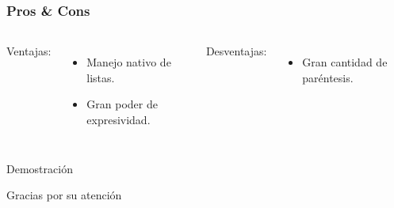 \documentclass{beamer}
\begin{document}

\begin{frame}
\frametitle{Pros \& Cons}
\begin{columns}[c] %

Ventajas:
\begin{itemize}
  \item Manejo nativo de listas.
  \item Gran poder de expresividad.
\end{itemize}

Desventajas:
\begin{itemize}
  \item Gran cantidad de par\'entesis.
\end{itemize}
\end{columns}
\end{frame}

\begin{frame}
\Huge{\centerline{Demostraci\'on}}
\end{frame}


\begin{frame}
\Huge{\centerline{Gracias por su atenci\'on}}
\end{frame}

\end{document}
